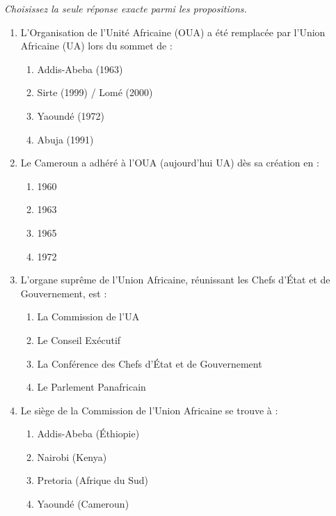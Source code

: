 \documentclass[11pt]{article}
\begin{document}
\begin{exercice}
\emph{Choisissez la seule réponse exacte parmi les propositions.}
\begin{enumerate}
    \item L'Organisation de l'Unité Africaine (OUA) a été remplacée par l'Union Africaine (UA) lors du sommet de :
    \begin{enumerate}
        \item Addis-Abeba (1963)
        \item Sirte (1999) / Lomé (2000)
        \item Yaoundé (1972)
        \item Abuja (1991)
    \end{enumerate}
    \item Le Cameroun a adhéré à l'OUA (aujourd'hui UA) dès sa création en :
    \begin{enumerate}
        \item 1960
        \item 1963
        \item 1965
        \item 1972
    \end{enumerate}
    \item L'organe suprême de l'Union Africaine, réunissant les Chefs d'État et de Gouvernement, est :
    \begin{enumerate}
        \item La Commission de l'UA
        \item Le Conseil Exécutif
        \item La Conférence des Chefs d'État et de Gouvernement
        \item Le Parlement Panafricain
    \end{enumerate}
    \item Le siège de la Commission de l'Union Africaine se trouve à :
    \begin{enumerate}
        \item Addis-Abeba (Éthiopie)
        \item Nairobi (Kenya)
        \item Pretoria (Afrique du Sud)
        \item Yaoundé (Cameroun)
    \end{enumerate}
\end{enumerate}
\end{exercice}
\end{document}
